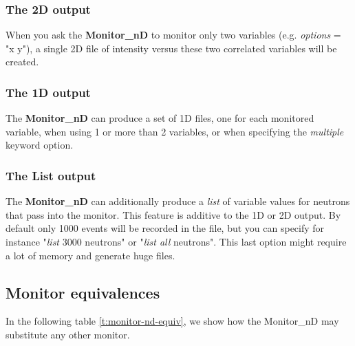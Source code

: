\subsubsection{The 2D output}

When you ask the {\bf Monitor\_nD} to monitor only two variables (e.g.
{\it options} = "x y"), a single 2D file of intensity versus these two
correlated variables will be created.

\subsubsection{The 1D output}

The {\bf Monitor\_nD} can produce a set of 1D files, one for each
monitored variable, when using 1 or more than 2 variables, or when
specifying the {\it multiple} keyword option.

\subsubsection{The List output}

The {\bf Monitor\_nD} can additionally produce a {\it list} of variable
values for neutrons that pass into the monitor. This feature is additive
to the 1D or 2D output. By default only 1000 events will be recorded in
the file, but you can specify for instance "{\it list} 3000 neutrons" or
"{\it list all} neutrons". This last option might require a lot of
memory and generate huge files.

\subsection{Monitor equivalences}

In the following table \ref{t:monitor-nd-equiv}, we show how the Monitor\_nD may substitute any other \MCS monitor.

